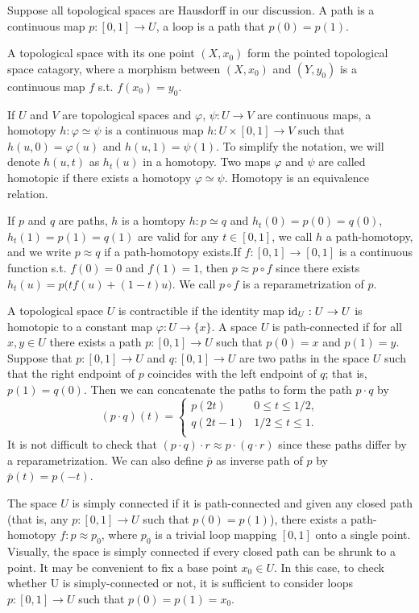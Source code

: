 \documentclass[12pt]{article}
\theoremstyle{plain}
\begin{document}
Suppose all topological spaces are Hausdorff in our discussion. A path is a continuous map $p:[0,1]\to U$, a loop is a path that $p(0)=p(1)$.

A topological space with its one point $(X,x_0)$ form the pointed topological space catagory, where a morphism between $(X,x_0)$ and $(Y,y_0)$ is a continuous map $f$ s.t. $f(x_0)=y_0$.

If $U$ and $V$ are topological spaces and $\varphi$, $\psi:U\to V$ are continuous maps, a homotopy $h : \varphi \simeq\psi$ is a continuous map $h : U × [0,1] \to V$ such that $h(u,0) = \varphi(u)$ and $h(u,1) = \psi(1)$. To simplify the notation, we will denote
$h(u, t)$ as $h_t(u)$ in a homotopy. Two maps $\varphi$ and $\psi$ are called homotopic if there exists a homotopy $\varphi \simeq\psi$. Homotopy is an equivalence relation.

If $p$ and $q$ are paths, $h$ is a homtopy $h: p \simeq q$ and $h_t(0)=p(0)=q(0)$, $h_t(1)=p(1)=q(1)$ are valid for any $t\in[0,1]$, we call $h$ a path-homotopy, and we write $p \approx q$ if a path-homotopy exists.If $f:[0,1]\to[0,1]$ is a continuous function s.t. $f(0)=0$ and $f(1)=1$, then $p\approx p\circ f$ since there exists $h_t(u)=p\bigl(tf(u)+(1-t)u\bigr)$. We call $p\circ f$ is a reparametrization of $p$.

A topological space $U$ is contractible if the identity map $\operatorname{id}_U:U\to U$ is homotopic to a constant map $\varphi:U\to \{x\}$. A space
$U$ is path-connected if for all $x, y \in U$ there exists a path $p : [0,1] \to U$ such that $p(0) = x$ and $p(1) = y$.
Suppose that $p : [0,1] \to U$ and $q : [0,1] \to U$ are two paths in the space $U$ such that the right endpoint of $p$ coincides with the left endpoint of $q$; that is, $p(1) = q(0)$. Then we can concatenate the paths to form the path $p\cdot q$ by
\[
	(p\cdot q)(t)=
	\begin{cases}
		p(2t) &0 \leq t\leq 1/2,\\
		q(2t-1)&1/2 \leq t\leq 1.\\
	\end{cases}
\]
It is not difficult to check that $(p\cdot q)\cdot r \approx p\cdot (q\cdot r)$ since these paths differ by a reparametrization. We can also define $\bar{p}$ as inverse path of $p$ by $\bar{p}(t)=p(-t)$.

The space $U$ is simply connected if it is path-connected and given any
closed path (that is, any $p : [0,1] \to U$ such that $p(0) = p(1)$), there exists a path-homotopy $f : p \approx p_0$, where $p_0$ is a trivial loop mapping $[0,1]$ onto a single point. Visually, the space is simply connected if every closed path can be shrunk to a point. It may be convenient to fix a base point $x_0 \in U$. In this case, to check whether U is simply-connected or not, it is sufficient to consider
loops $p : [0,1] \to U$ such that $p(0) = p(1) = x_0$.
\end{document}
